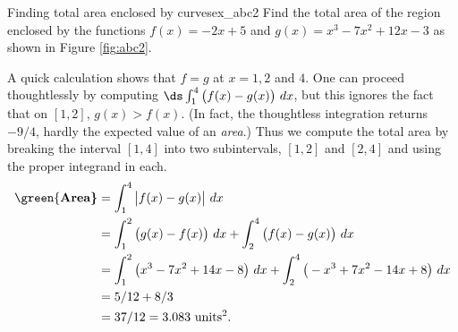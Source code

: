 \begin{example}{Finding total area enclosed by curves}{ex_abc2}{
Find the total area of the region enclosed by the functions $f(x) = -2x+5$ and $g(x) = x^3-7x^2+12x-3$ as shown in Figure \ref{fig:abc2}.}
\end{example}

\begin{solution}
\begin{center}
\end{center}

A quick calculation shows that $f=g$ at $x=1, 2$ and $ 4 $. One can proceed thoughtlessly by computing $\ds \int_1^4 \big(f(x)-g(x)\big)\ dx$, but this ignores the fact that on $[1,2]$, $g(x)>f(x)$. (In fact, the thoughtless integration returns $-9/4$, hardly the expected value of an \textit{area}.) Thus we compute the total area by breaking the interval $[1,4]$ into two subintervals, $[1,2]$ and $[2,4]$ and using the proper integrand in each.
\begin{align*}
\text{\mbox{\green{\bf Area}}} &= \int_1^4 \big|f(x)-g(x)\big|\ dx\\ 
&= \int_1^2 \big(g(x)-f(x)\big)\ dx + \int_2^4\big(f(x)-g(x)\big)\ dx\\
			&= \int_1^2 \big(x^3-7x^2+14x-8\big) \ dx + \int_2^4\big(-x^3+7x^2-14x+8\big)\ dx\\
			&= 5/12 + 8/3 \\
			&= 37/12 = 3.083\ \text{units}^2.
\end{align*}		
\end{solution}



